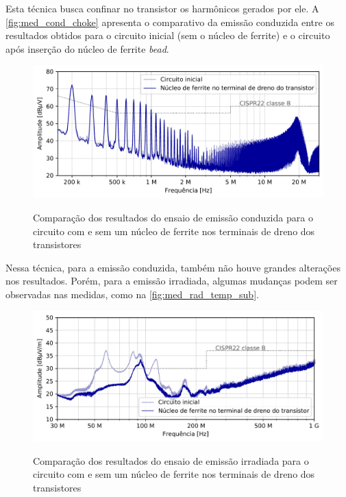     Esta técnica busca confinar no transistor os harmônicos gerados por ele. A \autoref{fig:med_cond_choke} apresenta o comparativo da emissão conduzida entre os resultados obtidos para o circuito inicial (sem o núcleo de ferrite) e o circuito após inserção do núcleo de ferrite \textit{bead}. 
    
    \begin{figure}[H]
    	\centering 
    	\caption{Comparação dos resultados do ensaio de emissão conduzida para o circuito com e sem um núcleo de ferrite nos terminais de dreno dos transistores}
    	\includegraphics[scale=.9]{pdf/cond/Choke bead no terminal de dreno do transistor.pdf}
    	\label{fig:med_cond_choke}
    \end{figure}
    
    Nessa técnica, para a emissão conduzida, também não houve grandes alterações nos resultados. Porém, para a emissão irradiada, algumas mudanças podem ser observadas nas medidas, como na \autoref{fig:med_rad_temp_sub}.  
    
    \begin{figure}[H]
    	\centering
    	\caption{Comparação dos resultados do ensaio de emissão irradiada para o circuito com e sem um núcleo de ferrite nos terminais de dreno dos transistores}
    	\includegraphics[scale=.9]{pdf/rad/Choke bead no terminal de dreno do transistor.pdf}
    	\label{fig:med_rad_choke}
    \end{figure}
    
